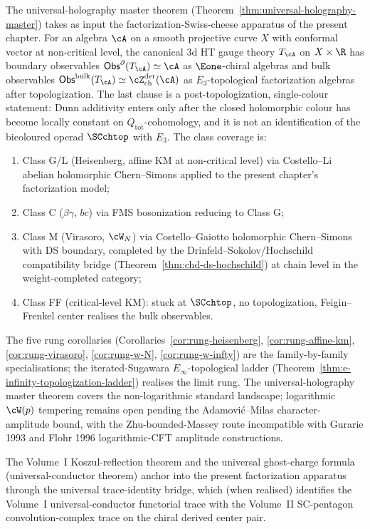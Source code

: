 \begin{remark}
\label{rem:factorization-universal-holography-anchor}%
%
The universal-holography master theorem
(Theorem~\ref{thm:universal-holography-master}) takes as input the
factorization-Swiss-cheese apparatus of the present chapter. For an
algebra $\cA$ on a smooth projective curve $X$ with conformal vector
at non-critical level, the canonical 3d HT gauge theory $T_\cA$ on
$X \times \R$ has boundary observables
$\Obs^\partial(T_\cA) \simeq \cA$ as $\Eone$-chiral algebras and bulk
observables
$\Obs^{\mathrm{bulk}}(T_\cA) \simeq \cZ^{\mathrm{der}}_{\mathrm{ch}}(\cA)$
as $E_3$-topological factorization algebras after topologization. The
last clause is a post-topologization, single-colour statement: Dunn
additivity enters only after the closed holomorphic colour has become
locally constant on $Q_{\mathrm{tot}}$-cohomology, and it is not an
identification of the bicoloured operad $\SCchtop$ with $E_3$. The
class coverage is:
\begin{enumerate}[label=(\roman*)]
\item Class G/L (Heisenberg, affine KM at non-critical level) via
Costello--Li abelian holomorphic Chern--Simons applied to the present
chapter's factorization model;
\item Class C ($\beta\gamma$, $bc$) via FMS bosonization reducing to
Class G;
\item Class M (Virasoro, $\cW_N$) via Costello--Gaiotto holomorphic
Chern--Simons with DS boundary, completed by the Drinfeld--Sokolov/Hochschild
compatibility bridge (Theorem~\ref{thm:chd-ds-hochschild}) at chain
level in the weight-completed category;
\item Class FF (critical-level KM): stuck at $\SCchtop$, no
topologization, Feigin--Frenkel center realises the bulk observables.
\end{enumerate}
The five rung corollaries (Corollaries~\ref{cor:rung-heisenberg},
\ref{cor:rung-affine-km}, \ref{cor:rung-virasoro},
\ref{cor:rung-w-N}, \ref{cor:rung-w-infty}) are the family-by-family
specialisations; the iterated-Sugawara $E_\infty$-topological ladder
(Theorem~\ref{thm:e-infinity-topologization-ladder}) realises the
limit rung. The universal-holography master theorem covers the
non-logarithmic standard landscape; logarithmic
$\cW(p)$ tempering remains open pending the Adamovi\'c--Milas
character-amplitude bound, with the Zhu-bounded-Massey route
incompatible with Gurarie 1993 and Flohr 1996 logarithmic-CFT
amplitude constructions.

The Volume~I Koszul-reflection theorem and the universal
ghost-charge formula (universal-conductor theorem) anchor into the
present factorization apparatus through the universal trace-identity
bridge, which (when realised) identifies the Volume~I universal-conductor
functorial trace with the Volume~II SC-pentagon convolution-complex
trace on the chiral derived center pair.
\end{remark}

